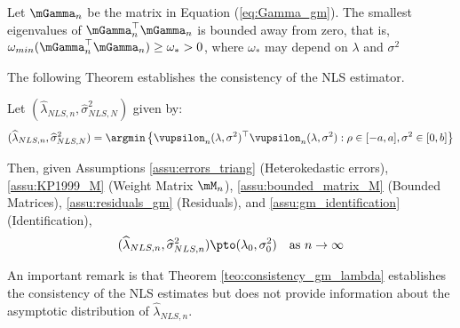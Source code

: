 \documentclass[english,12pt]{book}\usepackage[]{graphicx}\usepackage[]{xcolor}
\begin{document}
\begin{assumption}\label{assu:gm_identification} Let $\mGamma_n$ be the matrix in Equation (\ref{eq:Gamma_gm}). The smallest eigenvalues of $\mGamma^\top_n\mGamma_n$ is bounded away from zero, that is, $\omega_{min} (\mGamma^\top_n\mGamma_n) \geq \omega_* > 0$, where $\omega_*$ may depend on $\lambda$ and $\sigma^2$
\end{assumption}

The following Theorem establishes the consistency of the NLS estimator. 

\begin{theorem}[Consistency]\label{teo:consistency_gm_lambda}
Let $(\widehat{\lambda}_{NLS, n}, \widehat{\sigma}^2_{NLS, N})$ given by:
\begin{equation*}
  (\widehat{\lambda}_{NLS, n}, \widehat{\sigma}^2_{NLS, N}) = \argmin \left\lbrace \vupsilon_n(\lambda, \sigma^2)^\top\vupsilon_n(\lambda, \sigma^2): \rho \in [-a, a], \sigma^2\in [0, b]\right\rbrace 
\end{equation*}

Then, given Assumptions \ref{assu:errors_triang} (Heterokedastic errors), \ref{assu:KP1999_M} (Weight Matrix $\mM_n$), \ref{assu:bounded_matrix_M} (Bounded Matrices), \ref{assu:residuals_gm} (Residuals), and \ref{assu:gm_identification} (Identification),
\begin{equation*}
(\widehat{\lambda}_{NLS, n}, \widehat{\sigma}^2_{NLS, n})  \pto (\lambda_0, \sigma^2_0)\quad \mbox{as $n\to \infty$}
\end{equation*}
\end{theorem}

An important remark is that Theorem \ref{teo:consistency_gm_lambda} establishes the consistency of the NLS estimates but does not provide information about the asymptotic distribution of  $\widehat{\lambda}_{NLS, n}$.
\end{document}
